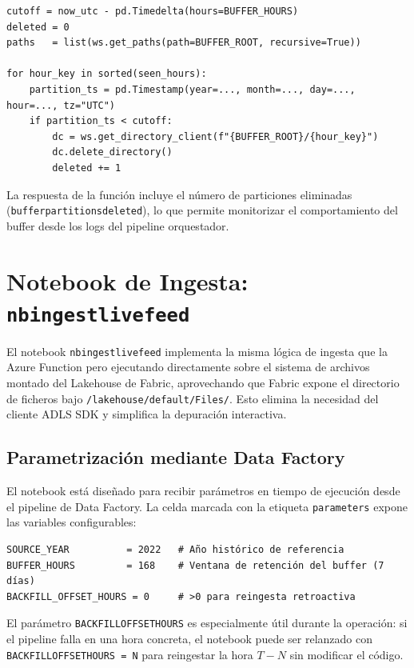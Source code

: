 \documentclass[12pt,oneside,a4paper]{report}
\renewcommand{\_}{\textunderscore\allowbreak}
\begin{document}
\begin{lstlisting}[style=pystyle, caption={Poda automática de particiones antiguas del rolling buffer.}]
cutoff = now_utc - pd.Timedelta(hours=BUFFER_HOURS)
deleted = 0
paths   = list(ws.get_paths(path=BUFFER_ROOT, recursive=True))

for hour_key in sorted(seen_hours):
    partition_ts = pd.Timestamp(year=..., month=..., day=..., hour=..., tz="UTC")
    if partition_ts < cutoff:
        dc = ws.get_directory_client(f"{BUFFER_ROOT}/{hour_key}")
        dc.delete_directory()
        deleted += 1
\end{lstlisting}

La respuesta de la función incluye el número de particiones eliminadas (\texttt{buffer\_partitions\_deleted}), lo que permite monitorizar el comportamiento del buffer desde los logs del pipeline orquestador.

\section{Notebook de Ingesta: \texttt{nb\_ingest\_live\_feed}}
\label{sec:nb_ingest}

El notebook \texttt{nb\_ingest\_live\_feed} implementa la misma lógica de ingesta que la Azure Function pero ejecutando directamente sobre el sistema de archivos montado del Lakehouse de Fabric, aprovechando que Fabric expone el directorio de ficheros bajo \texttt{/lakehouse/default/Files/}. Esto elimina la necesidad del cliente ADLS SDK y simplifica la depuración interactiva.

\subsection{Parametrización mediante Data Factory}
\label{sub:parametrizacion}

El notebook está diseñado para recibir parámetros en tiempo de ejecución desde el pipeline de Data Factory. La celda marcada con la etiqueta \texttt{parameters} expone las variables configurables:

\begin{lstlisting}[style=pystyle, caption={Parámetros configurables del notebook de ingesta.}]
SOURCE_YEAR          = 2022   # Año histórico de referencia
BUFFER_HOURS         = 168    # Ventana de retención del buffer (7 días)
BACKFILL_OFFSET_HOURS = 0     # >0 para reingesta retroactiva
\end{lstlisting}

El parámetro \texttt{BACKFILL\_OFFSET\_HOURS} es especialmente útil durante la operación: si el pipeline falla en una hora concreta, el notebook puede ser relanzado con \texttt{BACKFILL\_OFFSET\_HOURS = N} para reingestar la hora $T-N$ sin modificar el código.
\end{document}
